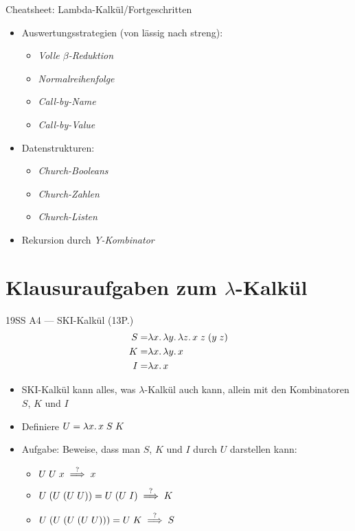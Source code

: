 \documentclass{beamer}
\begin{document}
\begin{frame}{Cheatsheet: Lambda-Kalkül/Fortgeschritten}
  \begin{itemize}
    \item Auswertungsstrategien (von lässig nach streng):
    \begin{itemize}
      \item \emph{Volle $\beta$-Reduktion}
      \item \emph{Normalreihenfolge}
      \item \emph{Call-by-Name}
      \item \emph{Call-by-Value}
    \end{itemize}
    \item Datenstrukturen:
    \begin{itemize}
      \item \emph{Church-Booleans}
      \item \emph{Church-Zahlen}
      \item \emph{Church-Listen}
    \end{itemize}
    \item Rekursion durch \emph{Y-Kombinator}
  \end{itemize}
\end{frame}

\section{Klausuraufgaben zum $\lambda$-Kalkül}

\begin{frame}{19SS A4 --- SKI-Kalkül (13P.)}
	\begin{eqnarray*}
          S =& \lambda x.\, \lambda y.\, \lambda z.\, x\;z\;(y\;z) \\
		K =& \lambda x.\, \lambda y.\, x \\
		I =& \lambda x.\, x
	\end{eqnarray*}

	\begin{itemize}
		\item SKI-Kalkül kann alles, was $\lambda$-Kalkül auch kann, allein mit den Kombinatoren $S$, $K$ und $I$
		\item Definiere $U = \lambda x.\, x\;S\;K$
		\item Aufgabe: Beweise, dass man $S$, $K$ und $I$ durch $U$ darstellen kann:
		\pause
		\begin{itemize}
			\item $U\;U\;x \stackrel{?}{\implies} x$
                        \item $U\;(U\;(U\;U)) = U\;(U\;I) \stackrel{?}{\implies} K$
                        \item $U\;(U\;(U\;(U\;U))) = U\;K \stackrel{?}{\implies} S$
		\end{itemize}
	\end{itemize}
\end{frame}
\end{document}
